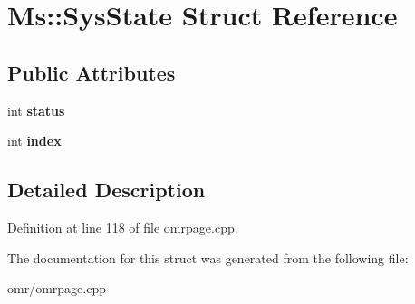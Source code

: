 \hypertarget{struct_ms_1_1_sys_state}{}\section{Ms\+:\+:Sys\+State Struct Reference}
\label{struct_ms_1_1_sys_state}
\subsection*{Public Attributes}
\begin{DoxyCompactItemize}
\item 
\mbox{\label{struct_ms_1_1_sys_state_a472964fd4b6b4f5b9f8b055adf5ad892}} 
int {\bfseries status}
\item 
\mbox{\label{struct_ms_1_1_sys_state_ac994e403fa7eba786a869bf154216b82}} 
int {\bfseries index}
\end{DoxyCompactItemize}


\subsection{Detailed Description}


Definition at line 118 of file omrpage.\+cpp.



The documentation for this struct was generated from the following file\+:\begin{DoxyCompactItemize}
\item 
omr/omrpage.\+cpp\end{DoxyCompactItemize}

